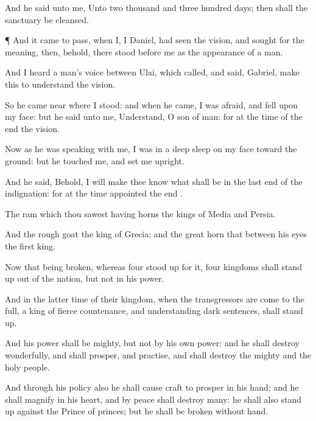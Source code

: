 {And he
said unto me, Unto two
thousand and
three
hundred
days; then shall the
sanctuary be
cleansed.


\par }{\PP {}¶ And it came to pass, when I,
{} I
Daniel, had
seen the
vision, and
sought for the
meaning, then, behold, there
stood before me as the
appearance of a
man.

And I
heard a
man’s
voice between
{}
Ulai, which
called, and
said,
Gabriel, make
this
{} to
understand the
vision.

So he
came
near where I
stood: and when he
came, I was
afraid, and
fell upon my
face: but he
said unto me,
Understand, O
son of
man: for at the
time of the
end
{} the
vision.

Now as he was
speaking with me, I was in a deep
sleep on my
face toward the
ground: but he
touched me, and
set me
upright.

And he
said, Behold, I will make thee
know what shall be in the last
end of the
indignation: for at the time
appointed the
end
{}.

The
ram which thou
sawest
having
{}
horns
{} the
kings of
Media and
Persia.

And the
rough
goat
{} the
king of
Grecia: and the
great
horn that
{} between his
eyes
{} the
first
king.

Now that being
broken, whereas
four stood
up for it,
four
kingdoms shall stand
up out of the
nation, but not in his
power.

And in the latter
time of their
kingdom, when the
transgressors are come to the
full, a
king of
fierce
countenance, and
understanding dark
sentences, shall stand
up.

And his
power shall be
mighty, but not by his own
power: and he shall
destroy
wonderfully, and shall
prosper, and
practise, and shall
destroy the
mighty and the
holy
people.

And through his
policy also he shall cause
craft to
prosper in his
hand; and he shall
magnify
{} in his
heart, and by
peace shall
destroy
many: he shall also stand
up against the
Prince of
princes; but he shall be
broken
without
hand.

}
